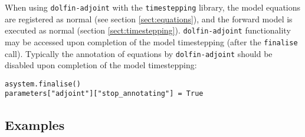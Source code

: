 \documentclass[a4paper]{book}
\begin{document}
When using \verb+dolfin-adjoint+ with the \verb+timestepping+ library, the
model equations are registered as normal (see section \ref{sect:equations}),
and the forward model is executed as normal (section \ref{sect:timestepping}).
\verb+dolfin-adjoint+ functionality may be accessed upon completion of the
model timestepping (after the \verb+finalise+ call). Typically the annotation
of equations by \verb+dolfin-adjoint+ should be disabled upon completion of the
model timestepping:
\begin{lstlisting}
asystem.finalise()
parameters["adjoint"]["stop_annotating"] = True
\end{lstlisting}

\subsection*{Examples}
\end{document}
